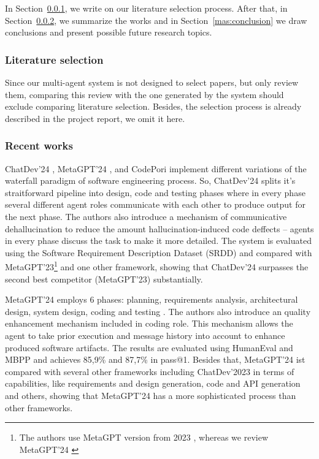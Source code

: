 In Section~\ref{mas:literature}, we write on our literature selection process. After that, in Section~\ref{mas:contributions}, we summarize the works and in Section~\ref{mas:conclusion} we draw conclusions and present possible future research topics.

\subsubsection{Literature selection}
\label{mas:literature}

Since our multi-agent system is not designed to select papers, but only review them, comparing this review with the one generated by the system should exclude comparing literature selection. Besides, the selection process is already described in the project report, we omit it here.

\subsubsection{Recent works}
\label{mas:contributions}


ChatDev'24 \cite{qian2024chatdevcommunicativeagentssoftware}, MetaGPT'24 \cite{hong2024metagptmetaprogrammingmultiagent}, and CodePori \cite{rasheed2024codeporilargescaleautonomoussoftware} implement different variations of the waterfall paradigm of software engineering process. So, ChatDev'24 splits it's straitforward pipeline into design, code and testing phases where in every phase several different agent roles communicate with each other to produce output for the next phase. The authors also introduce a mechanism of communicative dehallucination to reduce the amount hallucination-induced code deffects -- agents in every phase discuss the task to make it more detailed. The system is evaluated using the Software Requirement Description Dataset (SRDD)\cite{srdd} and compared with MetaGPT'23\footnote{The authors use MetaGPT version from 2023 \cite{metagpt23}, whereas we review MetaGPT'24 \cite{metagpt2024}} and one other framework, showing that ChatDev'24 surpasses the second best competitor (MetaGPT'23) substantially.

MetaGPT'24 \cite{hong2024metagptmetaprogrammingmultiagent} employs 6 phases: planning, requirements analysis, architectural design, system design, coding and testing . The authors also introduce an quality enhancement mechanism included in coding role. This mechanism allows the agent to take prior execution and message history into account to enhance produced software artifacts. The results are evaluated using HumanEval \cite{humaneval} and MBPP \cite{Cohan_2018} and achieves 85,9\% and 87,7\% in pass@1. Besides that, MetaGPT'24 ist compared with several other frameworks including ChatDev'2023 \cite{chatdev2023} in terms of capabilities,  like requirements and design generation, code and API generation and others, showing that MetaGPT'24 has a more sophisticated process than other frameworks.

